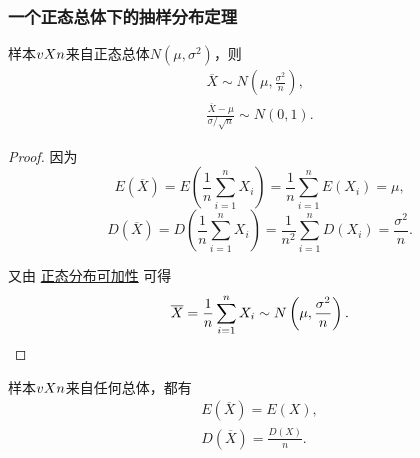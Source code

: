 \subsubsection{一个正态总体下的抽样分布定理}
\begin{theorem}
样本\(v{X}{n}\)来自正态总体\(N(\mu,\sigma^2)\)，则\begin{gather}
\overline{X} \sim N\left(\mu,\frac{\sigma^2}{n}\right), \\
\frac{\overline{X}-\mu}{\sigma / \sqrt{n}} \sim N(0,1).
\end{gather}
\begin{proof}
因为\[
E(\overline{X})=E\left(\frac{1}{n} \sum\limits_{i=1}^n X_i\right) = \frac{1}{n} \sum\limits_{i=1}^n E(X_i) = \mu,
\]\[
D(\overline{X})=D\left(\frac{1}{n} \sum\limits_{i=1}^n X_i\right) = \frac{1}{n^2} \sum\limits_{i=1}^n D(X_i) = \frac{\sigma^2}{n}.
\]

又由 \hyperref[theorem:正态分布与自然指数分布族.正态分布的可加性2]{正态分布可加性} 可得\[
\overline{X} = \frac{1}{n} \sum\limits_{i=1}^n X_i
\sim N\left(\mu,\frac{\sigma^2}{n}\right).
\qedhere
\]
\end{proof}
\end{theorem}

\begin{corollary}
样本\(v{X}{n}\)来自任何总体，都有\begin{gather}
E(\overline{X}) = E(X), \\
D(\overline{X}) = \frac{D(X)}{n}.
\end{gather}
\end{corollary}

